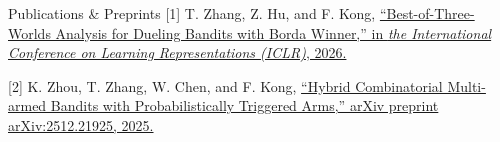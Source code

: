 \begin{rSection}{Publications \& Preprints}
{\small
[1] T. Zhang, Z. Hu, and F. Kong, \href{https://openreview.net/pdf?id=XCFL4Po1d8}{``Best-of-Three-Worlds Analysis for Dueling Bandits with Borda Winner,'' in \textit{the International Conference on Learning Representations (ICLR)}, 2026. }
}

\vspace{-0.5em}

{\small
[2] K. Zhou, T. Zhang, W. Chen, and F. Kong, \href{https://arxiv.org/pdf/2512.21925} {``Hybrid Combinatorial Multi-armed Bandits with Probabilistically Triggered Arms,'' arXiv preprint arXiv:2512.21925, 2025.}
}
\end{rSection}